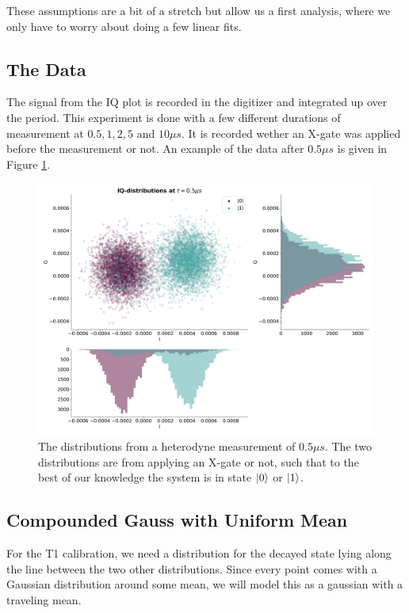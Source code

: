 These assumptions are a bit of a stretch but allow us a first analysis, where we only have to worry about doing a few linear fits.

\subsection{The Data}
The signal from the IQ plot is recorded in the digitizer and integrated up over the period. This experiment is done with a few different durations of measurement at $0.5, 1, 2, 5$ and $10 \mu s$. It is recorded wether an X-gate was applied before the measurement or not. An example of the data after $0.5 \mu s$ is given in Figure \ref{fig:raw_data_initial_IQ}.

\begin{figure}
    \centering
    \includegraphics{Figs/Results/IQ_plane_initial/IQ_raw_at_0.5.png}
    \caption{The distributions from a heterodyne measurement of $0.5 \mu s$. The two distributions are from applying an X-gate or not, such that to the best of our knowledge the system is in state $\ket{0}$ or $\ket{1}$.}
    \label{fig:raw_data_initial_IQ}
\end{figure}


\subsection{Compounded Gauss with Uniform Mean}
For the T1 calibration, we need a distribution for the decayed state lying along the line between the two other distributions. Since every point comes with a Gaussian distribution around some mean, we will model this as a gaussian with a traveling mean.

